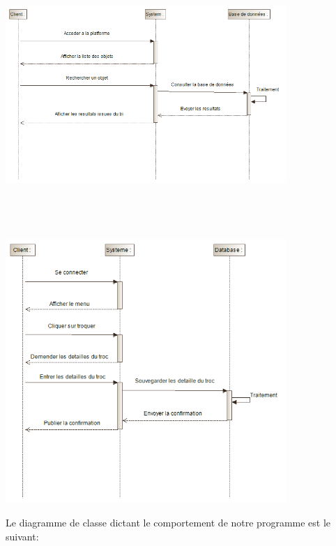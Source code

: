 \documentclass[12pt]{report}
\begin{document}
			\begin{center}
				\includegraphics[scale=1, width=0.8\textwidth, height=10cm]{troc0}
				\label{troc0}
			\end{center}
			\begin{center}
				\includegraphics[scale=1, width=0.8\textwidth, height=10cm]{troc1}
				\label{troc1}
			\end{center}
	Le diagramme de classe dictant le comportement de notre programme est le suivant:
\end{document}
